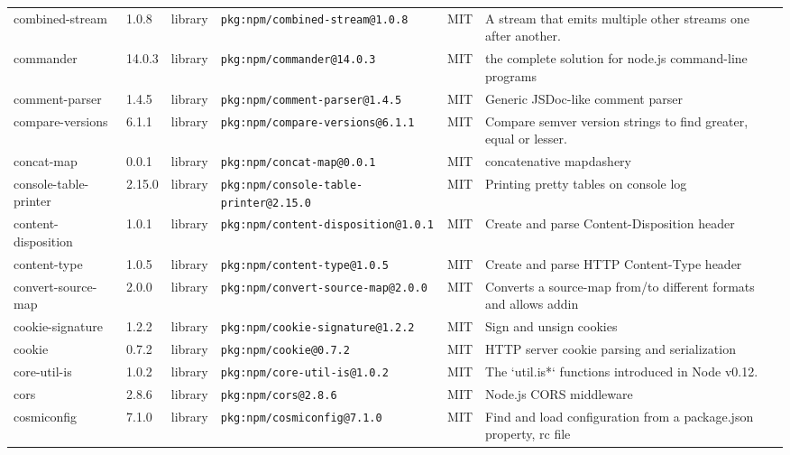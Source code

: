 \documentclass[11pt,a4paper]{article}
\begin{document}
\begin{longtable}{|p{4cm}|p{2cm}|p{1.6cm}|p{5cm}|p{1.5cm}|p{3.5cm}|}
\raggedright combined-stream & 1.0.8 & library & \small\texttt{pkg:npm/combined-stream@1.0.8} & MIT & \small A stream that emits multiple other streams one after another. \\
\raggedright commander & 14.0.3 & library & \small\texttt{pkg:npm/commander@14.0.3} & MIT & \small the complete solution for node.js command-line programs \\
\raggedright comment-parser & 1.4.5 & library & \small\texttt{pkg:npm/comment-parser@1.4.5} & MIT & \small Generic JSDoc-like comment parser \\
\raggedright compare-versions & 6.1.1 & library & \small\texttt{pkg:npm/compare-versions@6.1.1} & MIT & \small Compare semver version strings to find greater, equal or lesser. \\
\raggedright concat-map & 0.0.1 & library & \small\texttt{pkg:npm/concat-map@0.0.1} & MIT & \small concatenative mapdashery \\
\raggedright console-table-printer & 2.15.0 & library & \small\texttt{pkg:npm/console-table-printer@2.15.0} & MIT & \small Printing pretty tables on console log \\
\raggedright content-disposition & 1.0.1 & library & \small\texttt{pkg:npm/content-disposition@1.0.1} & MIT & \small Create and parse Content-Disposition header \\
\raggedright content-type & 1.0.5 & library & \small\texttt{pkg:npm/content-type@1.0.5} & MIT & \small Create and parse HTTP Content-Type header \\
\raggedright convert-source-map & 2.0.0 & library & \small\texttt{pkg:npm/convert-source-map@2.0.0} & MIT & \small Converts a source-map from/to  different formats and allows addin \\
\raggedright cookie-signature & 1.2.2 & library & \small\texttt{pkg:npm/cookie-signature@1.2.2} & MIT & \small Sign and unsign cookies \\
\raggedright cookie & 0.7.2 & library & \small\texttt{pkg:npm/cookie@0.7.2} & MIT & \small HTTP server cookie parsing and serialization \\
\raggedright core-util-is & 1.0.2 & library & \small\texttt{pkg:npm/core-util-is@1.0.2} & MIT & \small The `util.is*` functions introduced in Node v0.12. \\
\raggedright cors & 2.8.6 & library & \small\texttt{pkg:npm/cors@2.8.6} & MIT & \small Node.js CORS middleware \\
\raggedright cosmiconfig & 7.1.0 & library & \small\texttt{pkg:npm/cosmiconfig@7.1.0} & MIT & \small Find and load configuration from a package.json property, rc file \\

\end{longtable}
\end{document}
